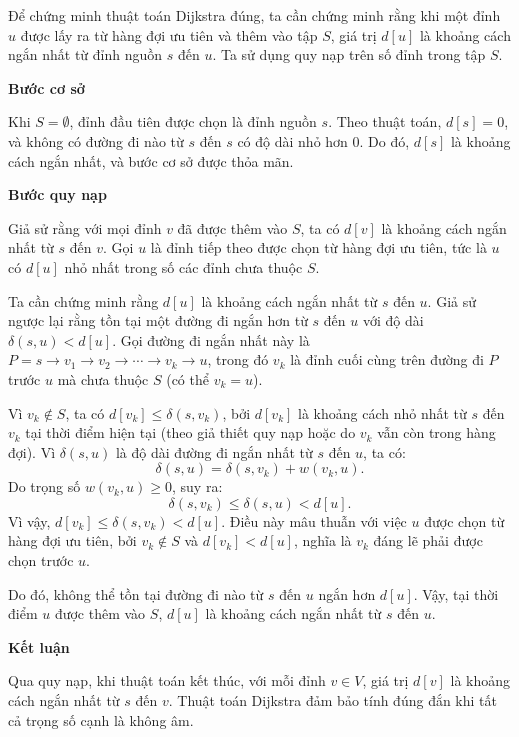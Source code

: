 \documentclass[a4paper,12pt]{article}
\begin{document}
Để chứng minh thuật toán Dijkstra đúng, ta cần chứng minh rằng khi một đỉnh \( u \) được lấy ra từ hàng đợi ưu tiên và thêm vào tập \( S \), giá trị \( d[u] \) là khoảng cách ngắn nhất từ đỉnh nguồn \( s \) đến \( u \). Ta sử dụng quy nạp trên số đỉnh trong tập \( S \).

\textbf{Bước cơ sở}

Khi \( S = \emptyset \), đỉnh đầu tiên được chọn là đỉnh nguồn \( s \). Theo thuật toán, \( d[s] = 0 \), và không có đường đi nào từ \( s \) đến \( s \) có độ dài nhỏ hơn 0. Do đó, \( d[s] \) là khoảng cách ngắn nhất, và bước cơ sở được thỏa mãn.

\textbf{Bước quy nạp}

Giả sử rằng với mọi đỉnh \( v \) đã được thêm vào \( S \), ta có \( d[v] \) là khoảng cách ngắn nhất từ \( s \) đến \( v \). Gọi \( u \) là đỉnh tiếp theo được chọn từ hàng đợi ưu tiên, tức là \( u \) có \( d[u] \) nhỏ nhất trong số các đỉnh chưa thuộc \( S \).

Ta cần chứng minh rằng \( d[u] \) là khoảng cách ngắn nhất từ \( s \) đến \( u \). Giả sử ngược lại rằng tồn tại một đường đi ngắn hơn từ \( s \) đến \( u \) với độ dài \( \delta(s, u) < d[u] \). Gọi đường đi ngắn nhất này là \( P = s \to v_1 \to v_2 \to \cdots \to v_k \to u \), trong đó \( v_k \) là đỉnh cuối cùng trên đường đi \( P \) trước \( u \) mà chưa thuộc \( S \) (có thể \( v_k = u \)).

Vì \( v_k \notin S \), ta có \( d[v_k] \leq \delta(s, v_k) \), bởi \( d[v_k] \) là khoảng cách nhỏ nhất từ \( s \) đến \( v_k \) tại thời điểm hiện tại (theo giả thiết quy nạp hoặc do \( v_k \) vẫn còn trong hàng đợi). Vì \( \delta(s, u) \) là độ dài đường đi ngắn nhất từ \( s \) đến \( u \), ta có:
\[
\delta(s, u) = \delta(s, v_k) + w(v_k, u).
\]
Do trọng số \( w(v_k, u) \geq 0 \), suy ra:
\[
\delta(s, v_k) \leq \delta(s, u) < d[u].
\]
Vì vậy, \( d[v_k] \leq \delta(s, v_k) < d[u] \). Điều này mâu thuẫn với việc \( u \) được chọn từ hàng đợi ưu tiên, bởi \( v_k \notin S \) và \( d[v_k] < d[u] \), nghĩa là \( v_k \) đáng lẽ phải được chọn trước \( u \).

Do đó, không thể tồn tại đường đi nào từ \( s \) đến \( u \) ngắn hơn \( d[u] \). Vậy, tại thời điểm \( u \) được thêm vào \( S \), \( d[u] \) là khoảng cách ngắn nhất từ \( s \) đến \( u \).

\textbf{Kết luận}

Qua quy nạp, khi thuật toán kết thúc, với mỗi đỉnh \( v \in V \), giá trị \( d[v] \) là khoảng cách ngắn nhất từ \( s \) đến \( v \). Thuật toán Dijkstra đảm bảo tính đúng đắn khi tất cả trọng số cạnh là không âm.
\end{document}
